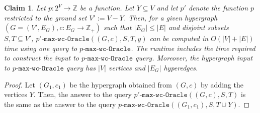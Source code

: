 \documentclass{article}
\newtheorem{claim}{Claim}[section]
\newcommand{\functionMaximizationOracle}[1]{\ensuremath{{#1}\text{-}\mathtt{max}\text{-}\mathtt{wc}\text{-}\mathtt{Oracle}}\xspace}
\providecommand{\Z}{\mathbb{Z}}
\begin{document}
\begin{claim}\label{claim:FunctionMaximizetionOracles:computing-maximal-tight-sets:maximization-oracle-for-restriction}
    Let $p:2^V\rightarrow\Z$ be a function. Let $Y \subseteq V$ and let $p'$ denote the function $p$ restricted to the ground set $V':=V - Y$. Then, for a given hypergraph $(G = (V', E_G), c:E_G\rightarrow\Z_+)$ such that $|E_G| \leq |E|$ and disjoint subsets $S, T \subseteq V'$, $\functionMaximizationOracle{p'}((G,c), S, T, y)$ can be computed in $O(|V| + |E|)$ time using one query to $\functionMaximizationOracle{p}$.
    The runtime includes the time required to construct the input to \functionMaximizationOracle{p} query. Moreover, the hypergraph input to \functionMaximizationOracle{p} query has $|V|$ vertices and $|E_G|$ hyperedges.
\end{claim}
\begin{proof}
    Let $(G_1, c_1)$ be the hypergraph obtained from $(G,c)$ by adding the vertices $Y$. Then, the answer to the query $\functionMaximizationOracle{p'}((G, c), S, T)$ is the same as the answer to the query $\functionMaximizationOracle{p}((G_1, c_1), S, T\cup Y)$.
\end{proof}
\end{document}
